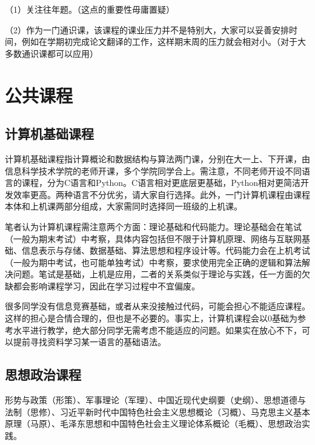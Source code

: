 \documentclass[11pt,oneside]{book}
\begin{document}
（1）关注往年题。（这点的重要性毋庸置疑）

（2）作为一门通识课，该课程的课业压力并不是特别大，大家可以妥善安排时间，例如在学期初完成论文翻译的工作，这样期末周的压力就会相对小。（对于大多数通识课都可以应用）


\section{公共课程}

\subsection{计算机基础课程}

计算机基础课程指计算概论和数据结构与算法两门课，分别在大一上、下开课，由信息科学技术学院的老师开课，多个学院同学合上。需注意，不同老师开设不同语言的课程，分为C语言和Python。C语言相对更底层更基础，Python相对更简洁开发效率更高。两种语言不分优劣，请大家自行选择。此外，一门计算机课程由课程本体和上机课两部分组成，大家需同时选择同一班级的上机课。

\vspace{10pt}

笔者认为计算机课程需注意两个方面：理论基础和代码能力。理论基础会在笔试（一般为期末考试）中考察，具体内容包括但不限于计算机原理、网络与互联网基础、信息表示与存储、数据基础、算法思想和程序设计等。代码能力会在上机考试（一般为期中考试，也可能单独考试）中考察，要求使用完全正确的逻辑和算法解决问题。笔试是基础，上机是应用，二者的关系类似于理论与实践，任一方面的欠缺都会影响课程学习，因此在学习过程中不宜偏废。

\vspace{10pt}

很多同学没有信息竞赛基础，或者从来没接触过代码，可能会担心不能适应课程。这样的担心是合情合理的，但也是不必要的。事实上，计算机课程会以0基础为参考水平进行教学，绝大部分同学无需考虑不能适应的问题。如果实在放心不下，可以提前寻找资料学习某一语言的基础语法。

\subsection{思想政治课程}
形势与政策（形策）、军事理论（军理）、中国近现代史纲要（史纲）、思想道德与法制（思修）、习近平新时代中国特色社会主义思想概论（习概）、马克思主义基本原理（马原）、毛泽东思想和中国特色社会主义理论体系概论（毛概）、思想政治实践。

\vspace{10pt}
\end{document}
